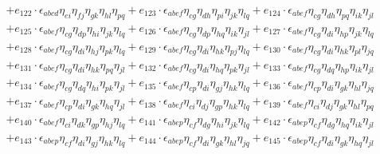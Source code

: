 \begin{itemize}
{\begin{minipage}[t]{\linewidth}
\begin{align}
    & + e_{122} \cdot \epsilon_{a b c d} \eta_{e i} \eta_{f j} \eta_{g k} \eta_{h l} \eta_{p q} + e_{123} \cdot \epsilon_{a b e f} \eta_{c g} \eta_{d h} \eta_{p i} \eta_{j k} \eta_{l q} + e_{124} \cdot \epsilon_{a b e f} \eta_{c g} \eta_{d h} \eta_{p q} \eta_{i k} \eta_{j l} \nonumber \\
    & + e_{125} \cdot \epsilon_{a b e f} \eta_{c g} \eta_{d p} \eta_{h i} \eta_{j k} \eta_{l q} + e_{126} \cdot \epsilon_{a b e f} \eta_{c g} \eta_{d p} \eta_{h q} \eta_{i k} \eta_{j l} + e_{127} \cdot \epsilon_{a b e f} \eta_{c g} \eta_{d i} \eta_{h p} \eta_{j k} \eta_{l q} \nonumber \\
    & + e_{128} \cdot \epsilon_{a b e f} \eta_{c g} \eta_{d i} \eta_{h j} \eta_{p k} \eta_{l q} + e_{129} \cdot \epsilon_{a b e f} \eta_{c g} \eta_{d i} \eta_{h k} \eta_{p j} \eta_{l q} + e_{130} \cdot \epsilon_{a b e f} \eta_{c g} \eta_{d i} \eta_{h k} \eta_{p l} \eta_{j q} \nonumber \\
    & + e_{131} \cdot \epsilon_{a b e f} \eta_{c g} \eta_{d i} \eta_{h k} \eta_{p q} \eta_{j l} + e_{132} \cdot \epsilon_{a b e f} \eta_{c g} \eta_{d i} \eta_{h q} \eta_{p k} \eta_{j l} + e_{133} \cdot \epsilon_{a b e f} \eta_{c g} \eta_{d q} \eta_{h p} \eta_{i k} \eta_{j l} \nonumber \\
    & + e_{134} \cdot \epsilon_{a b e f} \eta_{c g} \eta_{d q} \eta_{h i} \eta_{p k} \eta_{j l} + e_{135} \cdot \epsilon_{a b e f} \eta_{c p} \eta_{d i} \eta_{g j} \eta_{h k} \eta_{l q} + e_{136} \cdot \epsilon_{a b e f} \eta_{c p} \eta_{d i} \eta_{g k} \eta_{h l} \eta_{j q} \nonumber \\
    & + e_{137} \cdot \epsilon_{a b e f} \eta_{c p} \eta_{d i} \eta_{g k} \eta_{h q} \eta_{j l} + e_{138} \cdot \epsilon_{a b e f} \eta_{c i} \eta_{d j} \eta_{g p} \eta_{h k} \eta_{l q} + e_{139} \cdot \epsilon_{a b e f} \eta_{c i} \eta_{d j} \eta_{g k} \eta_{h l} \eta_{p q} \nonumber \\
    & + e_{140} \cdot \epsilon_{a b e f} \eta_{c i} \eta_{d k} \eta_{g p} \eta_{h j} \eta_{l q} + e_{141} \cdot \epsilon_{a b e p} \eta_{c f} \eta_{d g} \eta_{h i} \eta_{j k} \eta_{l q} + e_{142} \cdot \epsilon_{a b e p} \eta_{c f} \eta_{d g} \eta_{h q} \eta_{i k} \eta_{j l} \nonumber \\
    & + e_{143} \cdot \epsilon_{a b e p} \eta_{c f} \eta_{d i} \eta_{g j} \eta_{h k} \eta_{l q} + e_{144} \cdot \epsilon_{a b e p} \eta_{c f} \eta_{d i} \eta_{g k} \eta_{h l} \eta_{j q} + e_{145} \cdot \epsilon_{a b e p} \eta_{c f} \eta_{d i} \eta_{g k} \eta_{h q} \eta_{j l} \nonumber \\

\end{align}
\end{minipage}}
\end{itemize}
